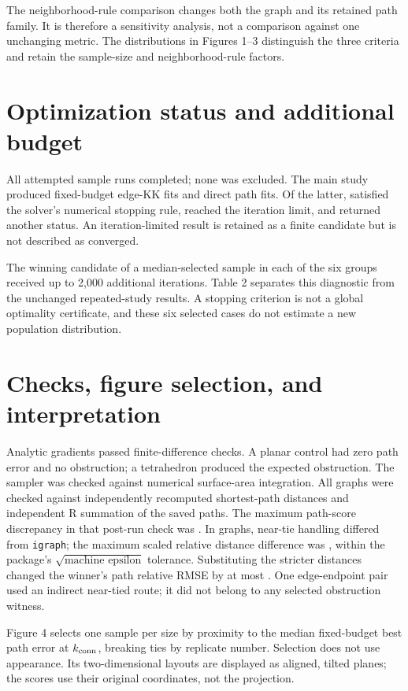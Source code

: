 \documentclass[10pt]{article}
\begin{document}
The neighborhood-rule comparison changes both the graph and its retained path
family. It is therefore a sensitivity analysis, not a comparison against one
unchanging metric. The distributions in Figures 1--3 distinguish the three
criteria and retain the sample-size and neighborhood-rule factors.

\section*{Optimization status and additional budget}
All attempted sample runs completed; none was excluded. The main study produced
\edgeFits{} fixed-budget edge-KK fits and \pathFits{} direct path fits.
Of the latter, \pathConverged{} satisfied the solver's numerical stopping rule,
\pathLimited{} reached the iteration limit, and \pathOther{} returned another
status. An iteration-limited result is retained as a finite candidate but is not
described as converged.

The winning candidate of a median-selected sample in each of the six groups
received up to 2,000 additional iterations. Table 2 separates this diagnostic
from the unchanged repeated-study results. A stopping criterion is not a global
optimality certificate, and these six selected cases do not estimate a new
population distribution.



\section*{Checks, figure selection, and interpretation}
Analytic gradients passed finite-difference checks. A planar control had zero
path error and no obstruction; a tetrahedron produced the expected obstruction.
The sampler was checked against numerical surface-area integration. All
\graphsTotal{} graphs were checked against independently recomputed shortest-path
distances and independent R summation of the saved paths. The maximum path-score
discrepancy in that post-run check was \pathCheckError{}.
In \nearTieGraphs{} graphs, near-tie handling differed from \texttt{igraph}; the
maximum scaled relative distance difference was \nearTieRelative{}, within the
package's $\sqrt{\text{machine epsilon}}$ tolerance. Substituting the stricter
distances changed the winner's path relative RMSE by at most \strictScoreChange{}.
One edge-endpoint pair used an indirect near-tied route; it did not belong to any
selected obstruction witness.

Figure 4 selects one sample per size by proximity to the median fixed-budget
best path error at $k_{\rm conn}$, breaking ties by replicate number. Selection
does not use appearance. Its two-dimensional layouts are displayed as aligned,
tilted planes; the scores use their original coordinates, not the projection.
\end{document}
